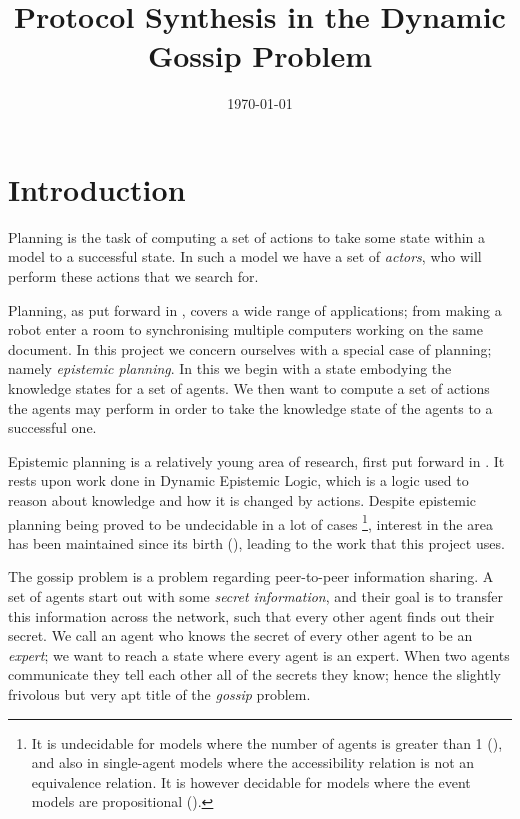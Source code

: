 \documentclass[12pt, a4paper]{article}
\title{Protocol Synthesis in the Dynamic Gossip Problem} %
\author{
	\authorstyle{Leo Poulson}
	\newline\newline %
}
\date{\today}
\begin{document}
\maketitle
\thispagestyle{firstpage}

\tableofcontents
\newpage

\section{Introduction}

Planning is the task of computing a set of actions to take some state within a
model to a successful state. In such a model we have a set of \textit{actors},
who will perform these actions that we search for.

Planning, as put forward in \cite{PlanningBook}, covers a wide range of
applications; from making a robot enter a room to synchronising multiple
computers working on the same document. In this project we concern ourselves
with a special case of planning; namely \textit{epistemic planning}. In this we
begin with a state embodying the knowledge states for a set of agents. We then
want to compute a set of actions the agents may perform in order to take the
knowledge state of the agents to a successful one.

Epistemic planning is a relatively young area of research, first put forward in
\cite{BolanderEP}. It rests upon work done in Dynamic Epistemic Logic, which is
a logic used to reason about knowledge and how it is changed by actions. Despite
epistemic planning being proved to be undecidable in a lot of cases
\footnote{It is undecidable for models where the number of agents is greater
  than 1 (\cite{UndecidabilityEP}), and also in single-agent models where the
  accessibility relation is not an equivalence relation. It is however decidable
  for models where the event models are propositional (\cite{DecidabilityEp}).},
interest in the area has been maintained since its birth
(\cite{AutomataTechniques}), leading to the work that this project uses.

\bigskip

The gossip problem is a problem regarding peer-to-peer information sharing. A
set of agents start out with some \textit{secret information}, and their goal is
to transfer this information across the network, such that every other agent
finds out their secret. We call an agent who knows the secret of every other
agent to be an \textit{expert}; we want to reach a state where every agent is an
expert. When two agents communicate they tell each other all of the secrets they
know; hence the slightly frivolous but very apt title of the \textit{gossip}
problem.
\end{document}

